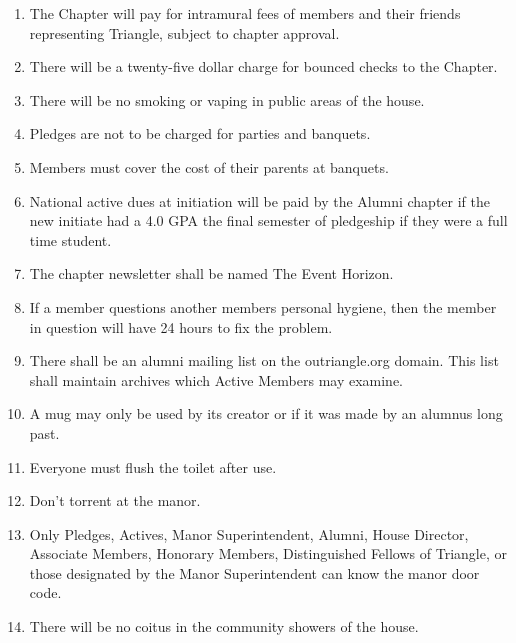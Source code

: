 \begin{enumerate}
\item The Chapter will pay for intramural fees of members and their friends representing Triangle, subject to chapter approval. 
\item There will be a twenty-five dollar charge for bounced checks to the Chapter. 
\item There will be no smoking or vaping in public areas of the house.  
\item Pledges are not to be charged for parties and banquets.  
\item Members must cover the cost of their parents at banquets.  
\item National active dues at initiation will be paid by the Alumni chapter if the new initiate had a 4.0 GPA the final semester of pledgeship if they were a full time student.
\item The chapter newsletter shall be named The Event Horizon. 
\item If a member questions another members personal hygiene, then the member in question will have 24 hours to fix the problem.
\item There shall be an alumni mailing list on the outriangle.org domain. This list shall maintain archives which Active Members may examine.
\item A mug may only be used by its creator or if it was made by an alumnus long past.
\item Everyone must flush the toilet after use.
\item Don’t torrent at the manor.
\item Only Pledges, Actives, Manor Superintendent, Alumni, House Director, Associate Members, Honorary Members, Distinguished Fellows of Triangle, or those designated by the Manor Superintendent can know the manor door code.
\item There will be no coitus in the community showers of the house.
\end{enumerate}
